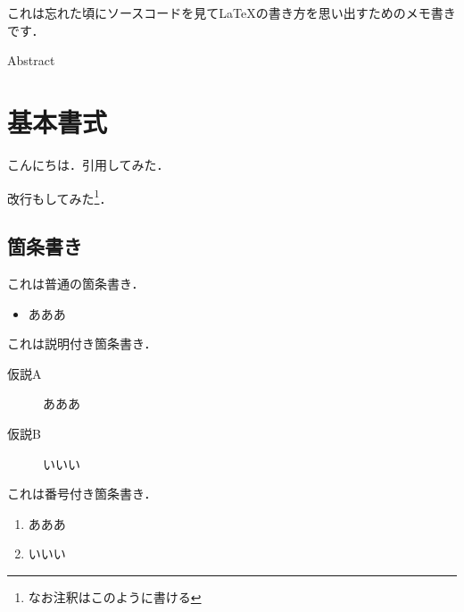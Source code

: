 \documentclass[a4j,8pt,fleqn]{jarticle}
\begin{document}



\begin{jabstract}
これは忘れた頃にソースコードを見てLaTeXの書き方を思い出すためのメモ書きです．
\end{jabstract}

\begin{eabstract}
Abstract
\end{eabstract}

\maketitle
\thispagestyle{empty}

\section{基本書式}
こんにちは．引用\cite{sample}してみた．\par
改行もしてみた\footnote{なお注釈はこのように書ける}．

\subsection{箇条書き}
これは普通の箇条書き．
\begin{itemize}
\item あああ
\end{itemize}
\par
これは説明付き箇条書き．
\begin{description}
 \item[仮説A]あああ
 \item[仮説B]いいい
\end{description}
\par
これは番号付き箇条書き．
\begin{enumerate}
  \item あああ
  \item いいい
\end{enumerate}
\end{document}
